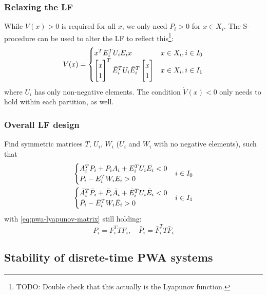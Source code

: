 \subsubsection{Relaxing the LF}
While $V(x) > 0$ is required for all $x$, we only need $P_i > 0$ for $x \in X_i$. The S-procedure can be used to alter the LF to reflect this\footnote{TODO: Double check that this actually is the Lyapunov function.}:
%
\begin{equation}
  V(x) =
  \begin{cases}
    x^{T} E_i^{T} U_i E_i x & x \in X_i, i \in I_0 \\
    \begin{bmatrix} x \\ 1 \end{bmatrix}^{T}
    \bar{E}_i^{T} U_i \bar{E}_i^{T}
    \begin{bmatrix} x \\ 1 \end{bmatrix} & x \in X_i, i \in I_1
  \end{cases}
\end{equation}
%
where $U_i$ has only non-negative elements. The condition $\dot{V}(x)<0$ only needs to hold within each partition, as well.

\subsubsection{Overall LF design}
Find symmetric matrices $T$, $U_i$, $W_i$ ($U_i$ and $W_i$ with no negative elements), such that
%
\begin{equation}
  \begin{split}
    \begin{cases}
      A_i^{T} P_i + P_i A_i + E_i^{T} U_i E_i < 0 \\
      P_i - E_i^{T} W_i E_i > 0
    \end{cases} &i \in I_0 \\
    \begin{cases}
      \bar{A}_i^{T} \bar{P}_i + \bar{P}_i \bar{A}_i + \bar{E}_i^{T} U_i \bar{E}_i < 0 \\
      \bar{P}_i - \bar{E}_i^{T} W_i \bar{E}_i > 0
    \end{cases} &i \in I_1
  \end{split}
\end{equation}
with \eqref{eq:pwa-lyapunov-matrix} still holding:
\begin{equation}
  P_i = F_i^T T F_i,\quad \bar{P}_i = \bar{F}_i^T T \bar{F}_i
\end{equation}

\subsection{Stability of disrete-time PWA systems}
